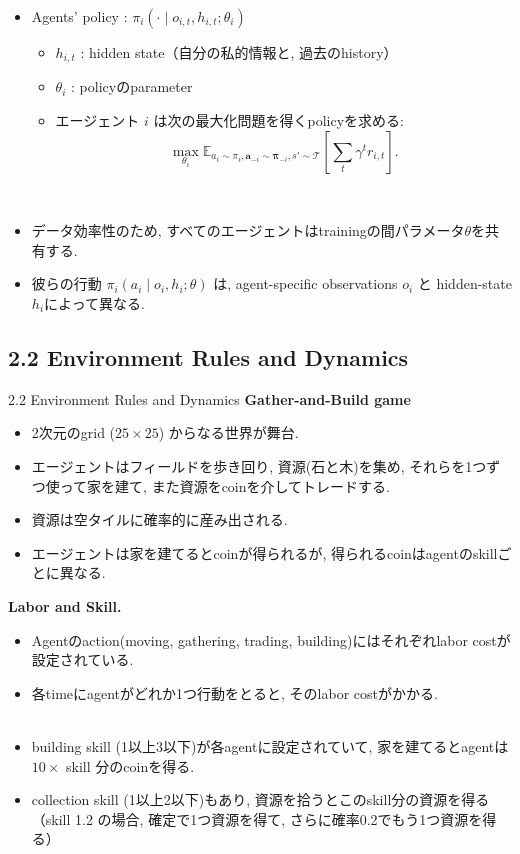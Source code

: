 \documentclass[unicode,aspectratio=169,11pt]{beamer}
\begin{document}
\begin{frame}{}{}
\begin{itemize}
    \item Agents' policy : $\pi_i(\cdot \mid o_{i,t}, h_{i,t}; \theta_i)$
    \begin{itemize}
        \item $h_{i,t}$ : hidden state（自分の私的情報と, 過去のhistory）
        \item $\theta_i$ : policyのparameter
        \item エージェント $i$ は次の最大化問題を得くpolicyを求める:
        \[
            \max_{\theta_i} \mathbb{E}_{a_i \sim \pi_i, \bm{a}_{-i} \sim \bm{\pi}_{-i}, s'\sim \mathscr{T}}\left[\sum_{t}\gamma^t r_{i,t}\right].
            \tag{1}
        \]
    \end{itemize}
    　
    \item データ効率性のため, すべてのエージェントはtrainingの間パラメータ$\theta$を共有する.
    \item 彼らの行動 $\pi_i(a_i\mid o_i, h_i; \theta)$ は, agent-specific observations $o_i$ と hidden-state $h_i$によって異なる.
\end{itemize}
\end{frame}

\subsection{2.2 Environment Rules and Dynamics}
\begin{frame}{2.2 Environment Rules and Dynamics}{}
{\bf Gather-and-Build game}
\begin{itemize}
    \item 2次元のgrid ($25 \times 25$) からなる世界が舞台.
    \item エージェントはフィールドを歩き回り, 資源(石と木)を集め, それらを1つずつ使って家を建て, また資源をcoinを介してトレードする.
    \item 資源は空タイルに確率的に産み出される.
    \item エージェントは家を建てるとcoinが得られるが, 得られるcoinはagentのskillごとに異なる.
\end{itemize}
\end{frame}

\begin{frame}{}{}
{\bf Labor and Skill.}
\begin{itemize}
    \item Agentのaction(moving, gathering, trading, building)にはそれぞれlabor costが設定されている.
    \item 各timeにagentがどれか1つ行動をとると, そのlabor costがかかる.\\
    　
    \item building skill (1以上3以下)が各agentに設定されていて, 家を建てるとagentは $10 \times$ skill 分のcoinを得る.
    \item collection skill (1以上2以下)もあり, 資源を拾うとこのskill分の資源を得る\\
          （skill 1.2 の場合, 確定で1つ資源を得て, さらに確率0.2でもう1つ資源を得る）
\end{itemize}
\end{frame}
\end{document}
